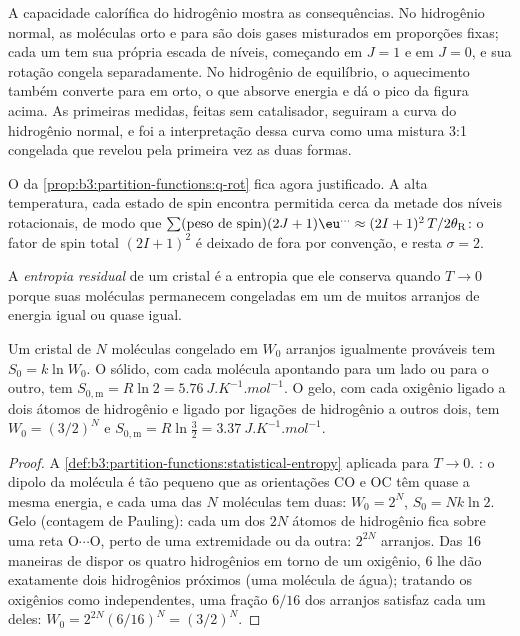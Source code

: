 A capacidade calorífica do hidrogênio mostra as consequências. No hidrogênio
normal, as moléculas orto e para são dois gases misturados em proporções fixas;
cada um tem sua própria escada de níveis, começando em $J = 1$ e em $J = 0$, e sua
rotação congela separadamente. No hidrogênio de equilíbrio, o aquecimento também
converte para em orto, o que absorve energia e dá o pico da figura acima. As
primeiras medidas, feitas sem catalisador, seguiram a curva do hidrogênio
normal, e foi a interpretação dessa curva como uma mistura 3:1 congelada que
revelou pela primeira vez as duas formas.

\begin{remark}
O  da \cref{prop:b3:partition-functions:q-rot} fica agora
justificado. A alta temperatura, cada estado de spin encontra permitida cerca da
metade dos níveis rotacionais, de modo que $\sum(\text{peso de spin})(2J+1)\eu^{\dots} \approx (2I+1)^2\,T/2\theta_{\mathrm R}$: o
fator de spin total $(2I+1)^2$ é deixado de fora por convenção, e resta $\sigma = 2$.
\end{remark}

\begin{definition}\label{def:b3:statistical-thermo-applied:residual-entropy}
A \emph{entropia residual} de um cristal é a entropia que
ele conserva quando $T \to 0$ porque suas moléculas permanecem congeladas em um de
muitos arranjos de energia igual ou quase igual.
\end{definition}

\begin{proposition}\label{prop:b3:statistical-thermo-applied:residual}
Um cristal de $N$ moléculas congelado em $W_0$ arranjos igualmente prováveis tem $S_0 =
k\ln W_0$. O  sólido, com cada molécula apontando para um lado ou para o outro,
tem $S_{0,\mathrm m} = R\ln2 =
\qty{5.76}{J.K^{-1}.mol^{-1}}$. O gelo, com cada oxigênio ligado a dois
átomos de hidrogênio e ligado por ligações de hidrogênio a outros dois, tem
$W_0 = (3/2)^N$ e $S_{0,\mathrm m} = R\ln\frac32 =
\qty{3.37}{J.K^{-1}.mol^{-1}}$.
\end{proposition}

\begin{proof}
A \cref{def:b3:partition-functions:statistical-entropy} aplicada para $T \to 0$.
: o dipolo da molécula é tão pequeno que as orientações CO e OC têm quase
a mesma energia, e cada uma das $N$ moléculas tem duas: $W_0 = 2^N$, $S_0 = Nk\ln2$.
Gelo (contagem de Pauling): cada um dos $2N$ átomos de hidrogênio fica sobre uma
reta O$\cdots$O, perto de uma extremidade ou da outra: $2^{2N}$ arranjos. Das 16
maneiras de dispor os quatro hidrogênios em torno de um oxigênio, 6 lhe dão
exatamente dois hidrogênios próximos (uma molécula de água); tratando os oxigênios
como independentes, uma fração $6/16$ dos arranjos satisfaz cada um deles: $W_0 = 2^{2N}(6/16)^N = (3/2)^N$.
\end{proof}

